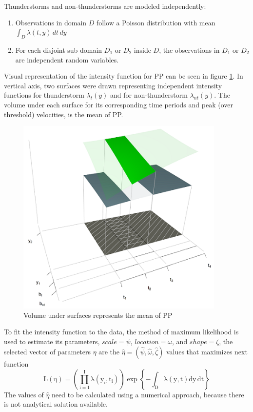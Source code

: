 \documentclass[12pt,oneside]{reedthesis}
\providecommand{\tightlist}{%
  \setlength{\itemsep}{0pt}\setlength{\parskip}{0pt}}
\begin{document}
Thunderstorms and non-thunderstorms are modeled independently:
\begin{enumerate}
\def\labelenumi{\arabic{enumi}.}
\tightlist
\item
  Observations in domain \(D\) follow a Poisson distribution with mean \(\int_D\lambda(t,y)\,dt\,dy\)
\item
  For each disjoint sub-domain \(D_1\) or \(D_2\) inside \(D\), the observations in \(D_1\) or \(D_2\) are independent random variables.
\end{enumerate}
Visual representation of the intensity function for PP can be seen in figure \ref{fig:plotdomain3dpp}. In vertical axis, two surfaces were drawn representing independent intensity functions for thunderstorm \(\lambda_t(y)\) and for non-thunderstorm \(\lambda_{nt}(y)\). The volume under each surface for its corresponding time periods and peak (over threshold) velocities, is the mean of PP.
\begin{figure}

{\centering \includegraphics[width=4.07in]{figure/domain3d} 

}

\caption{Volume under surfaces represents the mean of PP}\label{fig:plotdomain3dpp}
\end{figure}
To fit the intensity function to the data, the method of maximum likelihood is used to estimate its parameters, \(scale = \psi\), \(location = \omega\), and \(shape = \zeta\), the selected vector of parameters \(\eta\) are the \(\hat\eta = (\hat\psi, \hat\omega, \hat\zeta)\) values that maximizes next function
\begin{equation}
  \mathrm{
          L(\eta)=\left( 
                        \prod_{i=1}^I\lambda\left(y_i,t_i\right)  
                  \right)
                  \exp\left\{
                            -\int_{{D}}\lambda\left(y,t\right)dy\,dt
                     \right\}
         }
  \label{eq:pplikelihood}
\end{equation}
The values of \(\hat\eta\) need to be calculated using a numerical approach, because there is not analytical solution available.
\end{document}

